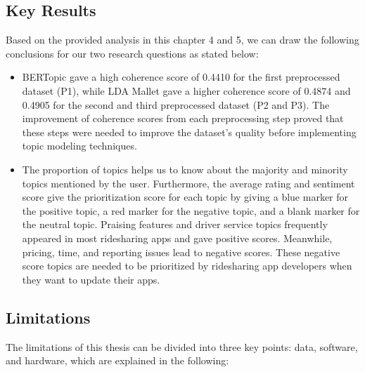 \documentclass[12pt]{article}
\begin{document}
\subsection{Key Results}
Based on the provided analysis in this chapter 4 and 5, we can draw the following conclusions for our two research questions as stated below:

\begin{itemize}
    \item BERTopic gave a high coherence score of 0.4410 for the first preprocessed dataset (P1), while LDA Mallet gave a higher coherence score of 0.4874 and 0.4905 for the second and third preprocessed dataset (P2 and P3). The improvement of coherence scores from each preprocessing step proved that these steps were needed to improve the dataset's quality before implementing topic modeling techniques.
    \item The proportion of topics helps us to know about the majority and minority topics mentioned by the user. Furthermore, the average rating and sentiment score give the prioritization score for each topic by giving a blue marker for the positive topic, a red marker for the negative topic, and a blank marker for the neutral topic. Praising features and driver service topics frequently appeared in most ridesharing apps and gave positive scores. Meanwhile, pricing, time, and reporting issues lead to negative scores. These negative score topics are needed to be prioritized by ridesharing app developers when they want to update their apps.
\end{itemize}

\subsection{Limitations}
The limitations of this thesis can be divided into three key points: data, software, and hardware, which are explained in the following:
\end{document}
